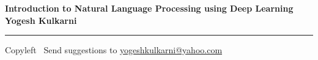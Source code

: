 
\graphicspath{{images/}}

\footnotesize


\begin{center}
\Large{\textbf{Introduction to Natural Language Processing using Deep Learning\\ Yogesh Kulkarni}}  
\end{center}

\begin{multicols}{2}

\end{multicols}

\rule{\linewidth}{0.25pt}
\scriptsize
Copyleft \textcopyleft\  Send suggestions to 
\href{http://www.yogeshkulkarni.com}{yogeshkulkarni@yahoo.com}


